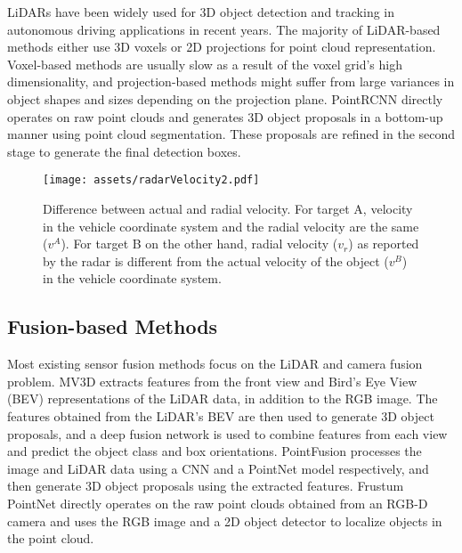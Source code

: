 \documentclass[10pt,twocolumn,letterpaper]{article}
\begin{document}
   LiDARs have been widely used for 3D object detection and tracking in autonomous
   driving applications in recent years. The majority of LiDAR-based methods either 
   use 3D voxels \cite{li3DFullyConvolutional2017,zhouVoxelNetEndtoEndLearning2017} 
   or 2D projections 
   \cite{liVehicleDetection3D2016, chenMultiView3DObject2017, yanSECONDSparselyEmbedded2018, yangPIXORRealtime3D2019} 
   for point cloud representation. Voxel-based methods are usually slow as a 
   result of the voxel grid's high dimensionality, and projection-based methods 
   might suffer from large variances in object shapes and sizes depending on the 
   projection plane. PointRCNN \cite{shiPointRCNN3DObject2019} directly 
   operates on raw point clouds and generates 3D object proposals in 
   a bottom-up manner using point cloud segmentation. These proposals are refined in 
   the second stage to generate the final detection boxes.
   
   \begin{figure}[t]
       \begin{center}
           \texttt{[image: assets/radarVelocity2.pdf]}
           \caption{Difference between actual and radial velocity. For target A, 
           velocity in the vehicle coordinate system and the radial velocity 
           are the same ($v^A$). For target B on the other hand, radial velocity ($v_r$) 
           as reported by the radar is different from the actual velocity of the 
           object ($v^B$) in the vehicle coordinate system.}
           \label{fig:radarVel}
       \end{center}
   \end{figure}
   
   \subsection{Fusion-based Methods}
   Most existing sensor fusion methods focus on the LiDAR 
   and camera fusion problem. MV3D \cite{Chen_2017} extracts features from the
   front view and Bird's Eye View (BEV) representations of the LiDAR data, 
   in addition to the RGB image. The features obtained from the LiDAR's BEV are then used 
   to generate 3D object proposals, and a deep fusion network is used to combine 
   features from each view and predict the object class and box orientations.
   PointFusion \cite{xuPointFusionDeepSensor2018} processes the image and LiDAR 
   data using a CNN and a PointNet model respectively, and then generate 3D object 
   proposals using the extracted features. Frustum PointNet \cite{qiFrustumPointNets3D2018a}
   directly operates on the raw point clouds obtained from an RGB-D camera 
   and uses the RGB image and a 2D object detector to localize objects in the point cloud.
   
\end{document}
